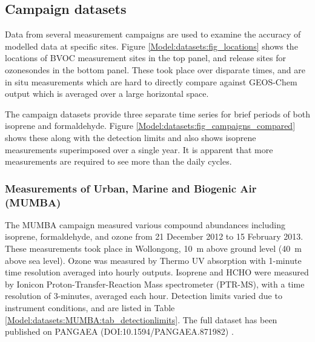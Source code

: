   
  \subsection{Campaign datasets}
  
    Data from several measurement campaigns are used to examine the accuracy of modelled data at specific sites.
    Figure \ref{Model:datasets:fig_locations} shows the locations of BVOC measurement sites in the top panel, and release sites for ozonesondes in the bottom panel.
    These took place over disparate times, and are in situ measurements which are hard to directly compare against GEOS-Chem output which is averaged over a large horizontal space.
    
    
    The campaign datasets provide three separate time series for brief periods of both isoprene and formaldehyde.
    Figure \ref{Model:datasets:fig_campaigns_compared} shows these along with the detection limits and also shows isoprene measurements superimposed over a single year.
    It is apparent that more measurements are required to see more than the daily cycles.
    
    
    

    
    \subsubsection{Measurements of Urban, Marine and Biogenic Air (MUMBA)}
    \label{Model:datasets:MUMBA}
    
      The MUMBA campaign \parencite{PatonWalsh2017} measured various compound abundances including isoprene, formaldehyde, and ozone from 21 December 2012 to 15 February 2013.
      These measurements took place in Wollongong, 10~m above ground level (40~m above sea level).
      Ozone was measured by Thermo UV absorption with 1-minute time resolution averaged into hourly outputs.
      Isoprene and HCHO were measured by Ionicon Proton-Transfer-Reaction Mass spectrometer (PTR-MS), with a time resolution of 3-minutes, averaged each hour.
      Detection limits varied due to instrument conditions, and are listed in Table \ref{Model:datasets:MUMBA:tab_detectionlimits}.
      The full dataset has been published on PANGAEA (DOI:10.1594/PANGAEA.871982) \parencite{Guerette2018}.
      
